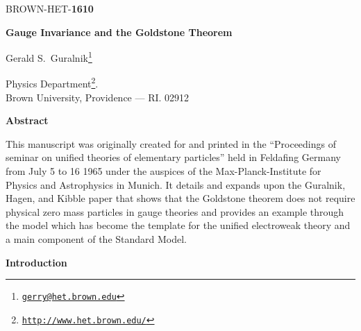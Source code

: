 \documentclass[%
  12pt,
  paper=letter,
  abstracton,
  pagesize=auto,
  version=last,
  DIV=calc
  ]{scrartcl}
\begin{document}
%
\begin{flushright}
  {\textsf{BROWN-HET-\textbf{1610}}}
\end{flushright}
\bigskip

\begin{center}
  {\Large \textbf{\textsf{Gauge Invariance and the Goldstone Theorem}}} \\
  \vspace{0.75in}

  {\Large \textsf{Gerald S.~Guralnik\footnote{\href{mailto:gerry@het.brown.edu}{\texttt{gerry@het.brown.edu}}}}} \\
  \bigskip\bigskip

  \textsf{Physics Department\footnote{\href{http://www.het.brown.edu/}{\texttt{http://www.het.brown.edu/}}}.}\\

  \textsf{Brown University, Providence --- RI. 02912}
\end{center}
\bigskip\bigskip\bigskip

\begin{center}
  \textbf{\textsf{Abstract}}
\end{center}
\bigskip
\noindent This manuscript was originally created for and printed in the
``Proceedings of seminar on unified theories of elementary particles''
held in Feldafing Germany from July 5 to 16 1965 under the auspices
of the Max-Planck-Institute for Physics and Astrophysics in
Munich. It details and expands upon the Guralnik, Hagen, and Kibble
paper that shows that the Goldstone theorem does not require
physical zero mass particles in gauge theories and provides an example through the model which has
become the template for the unified electroweak theory and a main component of the Standard Model.


\newpage
\begin{center}
  \textbf{\textsf{Introduction}}
\end{center}
\bigskip
\end{document}
